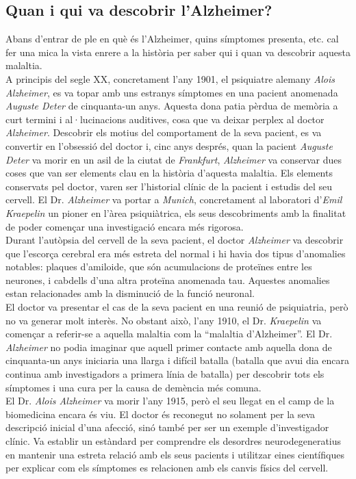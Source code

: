 \documentclass[a4paper,12pt]{article}
\begin{document}
\subsection*{Quan i qui va descobrir l'Alzheimer?}
Abans d'entrar de ple en què és l'Alzheimer, quins símptomes presenta, etc. cal fer una mica la vista enrere a la història per saber qui i quan va descobrir aquesta malaltia.\\
A principis del segle XX, concretament l'any 1901, el psiquiatre alemany \textit{Alois Alzheimer}, es va topar amb uns estranys símptomes en una pacient anomenada \textit{Auguste Deter} de cinquanta-un anys. Aquesta dona patia pèrdua de memòria a curt termini i al·lucinacions auditives, cosa que va deixar perplex al doctor \textit{Alzheimer}. Descobrir els motius del comportament de la seva pacient, es va convertir en l'obsessió del doctor i, cinc anys després, quan la pacient \textit{Auguste Deter} va morir en un asil de la ciutat de \textit{Frankfurt}, \textit{Alzheimer} va conservar dues coses que van ser elements clau en la història d'aquesta malaltia. Els elements conservats pel doctor, varen ser l'historial clínic de la pacient i estudis del seu cervell. El Dr. \textit{Alzheimer} va portar a \textit{Munich}, concretament al laboratori d'\textit{Emil Kraepelin} un pioner en l'àrea psiquiàtrica, els seus descobriments amb la finalitat de poder començar una investigació encara més rigorosa.\\
Durant l'autòpsia del cervell de la seva pacient, el doctor \textit{Alzheimer} va descobrir que l'escorça cerebral era més estreta del normal i hi havia dos tipus d'anomalies notables: plaques d'amiloide, que són acumulacions de proteïnes entre les neurones, i cabdells d'una altra proteïna anomenada tau. Aquestes anomalies estan relacionades amb la disminució de la funció neuronal.\\
El doctor va presentar el cas de la seva pacient en una reunió de psiquiatria, però no va generar molt interès. No obstant això, l'any 1910, el Dr. \textit{Kraepelin} va començar a referir-se a aquella malaltia com la “malaltia d'Alzheimer”. El Dr. \textit{Alzheimer} no podia imaginar que aquell primer contacte amb aquella dona de cinquanta-un anys iniciaria una llarga i difícil batalla (batalla que avui dia encara continua amb investigadors a primera línia de batalla) per descobrir tots els símptomes i una cura per la causa de demència més comuna.\\
El Dr. \textit{Alois Alzheimer} va morir l'any 1915, però el seu llegat en el camp de la biomedicina encara és viu. El doctor és reconegut no solament per la seva descripció inicial d'una afecció, sinó també per ser un exemple d'investigador clínic. Va establir un estàndard per comprendre els desordres neurodegeneratius en mantenir una estreta relació amb els seus pacients i utilitzar eines científiques per explicar com els símptomes es relacionen amb els canvis físics del cervell.
\end{document}
